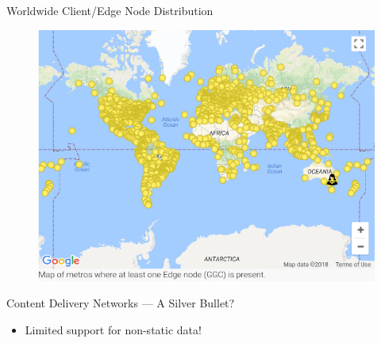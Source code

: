 \documentclass[12pt]{beamer}
\begin{document}
\begin{frame}{Worldwide Client/Edge Node Distribution}
    \begin{figure}
        \center
        \includegraphics[scale=0.45]{apollo_google_oceania_en}
    \end{figure}
\end{frame}

\begin{frame}{Content Delivery Networks --- A Silver Bullet?}
    \begin{itemize}
        \item{Limited support for non-static data!}
    \end{itemize}
\end{frame}

\end{document}
